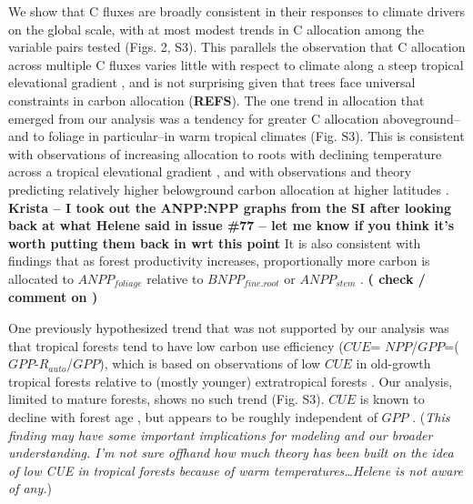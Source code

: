 \documentclass[
]{article}
\begin{document}
{We show that C fluxes are broadly consistent in their responses to
climate drivers on the global scale, with at most modest trends in C
allocation among the variable pairs tested (Figs. 2, S3). This parallels
the observation that C allocation across multiple C fluxes varies little
with respect to climate along a steep tropical elevational gradient
\citetext{\citealp{malhi_variation_2017}; \citealp[but
see][]{moser_elevation_2011}}, and is not surprising given that trees
face universal constraints in carbon allocation (\textbf{REFS}). The one
trend in allocation that emerged from our analysis was a tendency for
greater C allocation aboveground--and to foliage in particular--in warm
tropical climates (Fig. S3). This is consistent with observations of
increasing allocation to roots with declining temperature across a
tropical elevational gradient \citep{moser_elevation_2011}, and with
observations and theory predicting relatively higher belowground carbon
allocation at higher latitudes \citep{gill_belowground_2016}.
\textbf{Krista -- I took out the ANPP:NPP graphs from the SI after
looking back at what Helene said in issue \#77 -- let me know if you
think it's worth putting them back in wrt this point} It is also
consistent with findings that as forest productivity increases,
proportionally more carbon is allocated to \(ANPP_{foliage}\) relative
to \(BNPP_{fine.root}\) \citep{chen_allometry_2019} or \(ANPP_{stem}\)
\citep{hofhansl_new_2015}. \textbf{( check / comment on
\citet{litton_carbon_2007} )}

One previously hypothesized trend that was not supported by our analysis
was that tropical forests tend to have low carbon use efficiency
(\(CUE\)= \(NPP\)/\(GPP\)=(\(GPP\)-\(R_{auto}\)/\(GPP\)), which is based
on observations of low \(CUE\) in old-growth tropical forests relative
to (mostly younger) extratropical forests
\citep{de_lucia_forest_2007, malhi_productivity_2012, anderson-teixeira_carbon_2016}.
Our analysis, limited to mature forests, shows no such trend (Fig. S3).
\(CUE\) is known to decline with forest age
\citep{de_lucia_forest_2007, piao_forest_2010, collalti_is_2019}, but
appears to be roughly independent of \(GPP\) \citep{litton_carbon_2007}.
(\emph{This finding may have some important implications for modeling
and our broader understanding. I'm not sure offhand how much theory has
been built on the idea of low CUE in tropical forests because of warm
temperatures\ldots Helene is not aware of any.})

}
\end{document}
